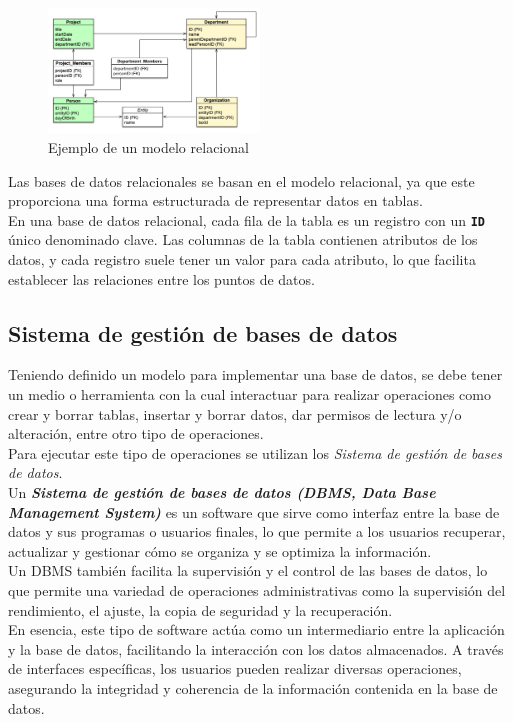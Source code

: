 \begin{figure}[h]
\centering
\includegraphics[width=0.5\textwidth]{images/ejemplo-modelo-relacional.png}
\caption{Ejemplo de un modelo relacional}
\end{figure}



Las bases de datos relacionales se basan en el modelo relacional, ya que este proporciona una forma estructurada de representar datos en tablas. \\En una base de datos relacional, cada fila de la tabla es un registro con un \textbf{\texttt{ID}} único denominado clave. Las columnas de la tabla contienen atributos de los datos, y cada registro suele tener un valor para cada atributo, lo que facilita establecer las relaciones entre los puntos de datos.\\


\subsection{Sistema de gestión de bases de datos}

Teniendo definido un modelo para implementar una base de datos, se debe tener un medio o herramienta con la cual interactuar para realizar operaciones como crear y borrar tablas, insertar y borrar datos, dar permisos de lectura y/o alteración, entre otro tipo de operaciones.\\
Para ejecutar este tipo de operaciones se utilizan los \textit{Sistema de gestión de bases de datos}. \\

Un \textbf{\textit{Sistema de gestión de bases de datos (DBMS, Data Base Management System)}} es un software que sirve como interfaz entre la base de datos y sus programas o usuarios finales, lo que permite a los usuarios recuperar, actualizar y gestionar cómo se organiza y se optimiza la información.\\ Un DBMS también facilita la supervisión y el control de las bases de datos, lo que permite una variedad de operaciones administrativas como la supervisión del rendimiento, el ajuste, la copia de seguridad y la recuperación.
\\
En esencia, este tipo de software actúa como un intermediario entre la aplicación y la base de datos, facilitando la interacción con los datos almacenados. A través de interfaces específicas, los usuarios pueden realizar diversas operaciones, asegurando la integridad y coherencia de la información contenida en la base de datos.\\

